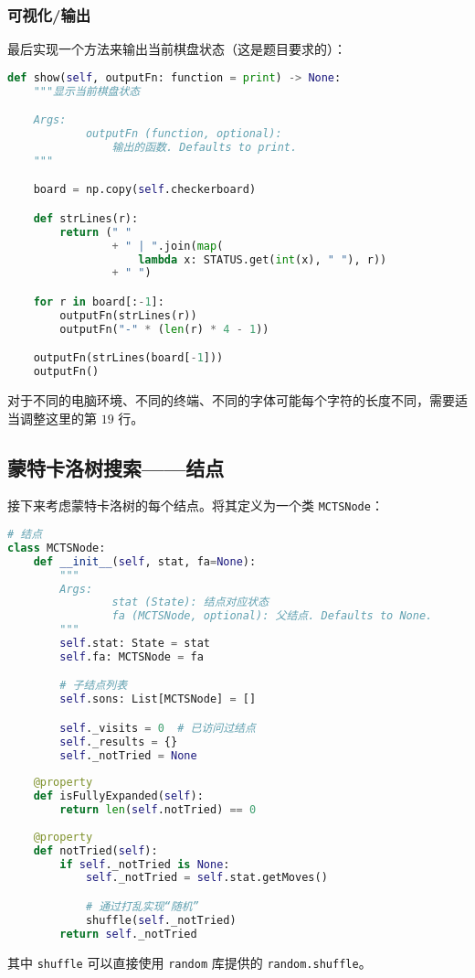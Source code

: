 \subsubsection{可视化/输出}
最后实现一个方法来输出当前棋盘状态（这是题目要求的）：
\begin{lstlisting}[language=python]
def show(self, outputFn: function = print) -> None:
    """显示当前棋盘状态

    Args:
            outputFn (function, optional):
                输出的函数. Defaults to print.
    """

    board = np.copy(self.checkerboard)

    def strLines(r):
        return (" "
                + " | ".join(map(
                    lambda x: STATUS.get(int(x), " "), r))
                + " ")

    for r in board[:-1]:
        outputFn(strLines(r))
        outputFn("-" * (len(r) * 4 - 1))

    outputFn(strLines(board[-1]))
    outputFn()
\end{lstlisting}
对于不同的电脑环境、不同的终端、不同的字体可能每个字符的长度不同，需要适当调整这里的第 $19$ 行。

\subsection{蒙特卡洛树搜索——结点}
接下来考虑蒙特卡洛树的每个结点。将其定义为一个类 \verb`MCTSNode`：
\begin{lstlisting}[language=python]
# 结点
class MCTSNode:
    def __init__(self, stat, fa=None):
        """
        Args:
                stat (State): 结点对应状态
                fa (MCTSNode, optional): 父结点. Defaults to None.
        """
        self.stat: State = stat
        self.fa: MCTSNode = fa

        # 子结点列表
        self.sons: List[MCTSNode] = []

        self._visits = 0  # 已访问过结点
        self._results = {}
        self._notTried = None
    
    @property
    def isFullyExpanded(self):
        return len(self.notTried) == 0
            
    @property
    def notTried(self):
        if self._notTried is None:
            self._notTried = self.stat.getMoves()

            # 通过打乱实现“随机”
            shuffle(self._notTried)
        return self._notTried
\end{lstlisting}
其中 \verb`shuffle` 可以直接使用 \verb`random` 库提供的 \verb`random.shuffle`。
